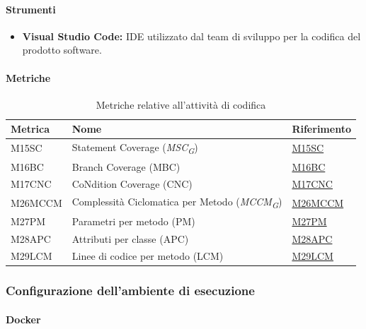 \paragraph{Strumenti}
\begin{itemize}
    \item \textbf{Visual Studio Code:} IDE utilizzato dal team di sviluppo per la codifica del prodotto software.
\end{itemize}

\paragraph{Metriche}
\begin{table}[H]
    \centering
    \begin{tabular}{|C{3cm}|C{3cm}|C{4cm}|}
    \hline
    Metrica & Nome & Riferimento \\
    \hline \hline
    M15SC & Statement Coverage (\textit{MSC}\textsubscript{\textit{G}}) &  \hyperlink{item:M15SC}{M15SC} \\
    M16BC & Branch Coverage (MBC) &  \hyperlink{item:M16BC}{M16BC} \\
    M17CNC & CoNdition Coverage (CNC) &  \hyperlink{item:M17CNC}{M17CNC} \\
    M26MCCM & Complessità Ciclomatica per Metodo (\textit{MCCM}\textsubscript{\textit{G}}) &  \hyperlink{item:M26MCCM}{M26MCCM} \\
    M27PM & Parametri per metodo (PM) & \hyperlink{item:M27PM}{M27PM} \\
    M28APC & Attributi per classe (APC) & \hyperlink{item:M28APC}{M28APC} \\
    M29LCM & Linee di codice per metodo (LCM) & \hyperlink{item:M29LCM}{M29LCM} \\ 
    \hline
    \end{tabular}
    \caption{Metriche relative all'attività di codifica}
\end{table}


\subsubsection{Configurazione dell'ambiente di esecuzione}
\paragraph{Docker}

